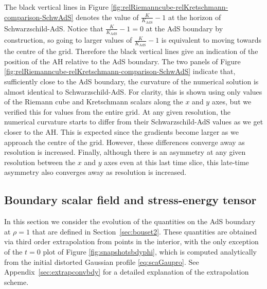 \documentclass[a4paper,11pt]{article}
\numberwithin{equation}{section}
\begin{document}
The black vertical lines in Figure \ref{fig:relRiemanncube-relKretschmann-comparison-SchwAdS} denotes the value of $\frac{K}{K_{\text{AdS}}}-1$ at the horizon of Schwarzschild-AdS. 
Notice that $\frac{K}{K_{\text{AdS}}}-1=0$ at the AdS boundary by construction, so going to larger values of $\frac{K}{K_{\text{AdS}}}-1$ is equivalent to moving towards the centre of the grid.
Therefore the black vertical lines give an indication of the position of the AH relative to the AdS boundary.
The two panels of Figure \ref{fig:relRiemanncube-relKretschmann-comparison-SchwAdS} indicate that, sufficiently close to the AdS boundary, the curvature of the numerical solution is almost identical to Schwarzschild-AdS. For clarity, this is shown using only values of the Riemann cube and Kretschmann scalars along the $x$ and $y$ axes, but we verified this for values from the entire grid. 
At any given resolution, the numerical curvature starts to differ from their Schwarzschild-AdS values as we get closer to the AH. This is expected since the gradients become larger as we approach the centre of the grid.
However, these differences converge away as resolution is increased.
Finally, although there is an asymmetry at any given resolution between the $x$ and $y$ axes even at this last time slice, this late-time asymmetry also converges away as resolution is increased.

\subsection{Boundary scalar field and stress-energy tensor}
\label{sec:resbouset}

In this section we consider the evolution of the quantities on the AdS boundary at $\rho=1$ that are defined in Section~\ref{sec:bouset2}. 
These quantities are obtained via third order extrapolation from points in the interior, with the only exception of the $t=0$ plot of Figure \ref{fig:snapshotsbdyphi}, which is computed analytically from the initial distorted Gaussian profile \eqref{eq:scaGaupro}. 
See Appendix~\ref{sec:extrapconvbdy} for a detailed explanation of the extrapolation scheme.
\end{document}
